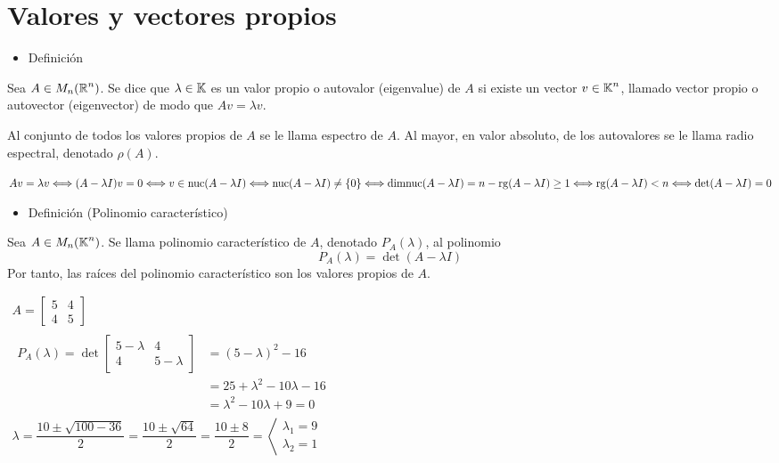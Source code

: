 \section{Valores y vectores propios}
\begin{itemize}[label=\color{red}\textbullet, leftmargin=*]
	\item \color{lightblue}Definición
\end{itemize}
Sea $A\in M_n(\operatorname{\mathbb{R}}^n)$. Se dice que $\lambda\in\operatorname{\mathbb{K}}$ es un valor propio o autovalor (eigenvalue) de $A$ si existe un vector  $v\in\operatorname{\mathbb{K}}^n$, llamado vector propio o autovector (eigenvector) de modo que $Av=\lambda v$.

Al conjunto de todos los valores propios de $A$ se le llama espectro de $A$. Al mayor, en valor absoluto, de los autovalores se le llama radio espectral, denotado $\rho(A)$.


$Av=\lambda v\Longleftrightarrow(A-\lambda I)v=0\Longleftrightarrow v\in\operatorname{\mathrm{nuc}}(A-\lambda I)\Longleftrightarrow\operatorname{\mathrm{nuc}}(A-\lambda I)\neq\{0\}\Longleftrightarrow\operatorname{\mathrm{dimnuc}}(A-\lambda I)=n-\operatorname{\mathrm{rg}}(A-\lambda I)\ge1\Longleftrightarrow\operatorname{\mathrm{rg}}(A-\lambda I)<n\Longleftrightarrow\det(A-\lambda I)=0$
\begin{itemize}[label=\color{red}\textbullet, leftmargin=*]
	\item \color{lightblue}Definición (Polinomio característico)
\end{itemize}
Sea $A\in M_n(\operatorname{\mathbb{K}}^n)$. Se llama polinomio característico de $A$, denotado $P_A(\lambda)$, al polinomio \[ P_A(\lambda)=\det(A-\lambda I) \]Por tanto, las raíces del polinomio característico son los valores propios de $A$.

\Ej

$\begin{array}{l}
	A=\begin{bmatrix}
		5 & 4\\
		4 & 5
	\end{bmatrix}\\
	\begin{aligned}
		P_A(\lambda)=\det\begin{bmatrix}
			5-\lambda & 4\\
			4 & 5-\lambda
		\end{bmatrix}&=(5-\lambda)^2-16\\
		&=25+\lambda^2-10\lambda-16\\
		&=\lambda^2-10\lambda+9=0
	\end{aligned}\\
	\lambda=\dfrac{10\pm\sqrt{100-36}}{2}=\dfrac{10\pm\sqrt{64}}{2}=\dfrac{10\pm8}{2}=\left\langle\begin{array}{l}
		\lambda_1=9\\
		\lambda_2=1
	\end{array}\right.
\end{array}$

